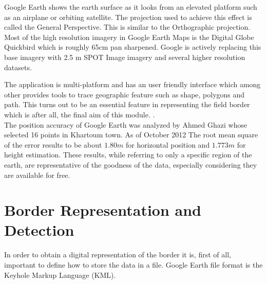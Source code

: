 Google Earth shows the earth surface as it looks from an elevated platform such as an airplane or orbiting satellite. The projection used to achieve this effect is called the General Perspective. This is similar to the Orthographic projection. Most of the high resolution imagery in Google Earth Maps is the Digital Globe Quickbird which is roughly 65cm pan sharpened. Google is actively replacing this base imagery with 2.5 m SPOT Image imagery and several higher resolution datasets.

The application is multi-platform and has an user friendly interface which among other provides tools to trace geographic feature such as shape, polygons and path. This turns out to be an essential feature in representing the field border which is after all, the final aim of this module. .\\
The position accuracy of Google Earth was analyzed by Ahmed Ghazi whose selected 16 points in Khartoum
town. As of October 2012 The root mean square of the error results to be about $1.80m$ for horizontal position and $1.773m$ for height estimation.\cite{PosAccuracyGE} These results, while referring to only a specific region of the earth, are representative of the goodness of the data, especially considering they are available for free.\\

\section{Border Representation and Detection} %
\label{sec:border_detection_and_representation}
In order to obtain a digital representation of the border it is, first of all, important to define how to store the data in a file. Google Earth file format is the Keyhole Markup Language (KML).

